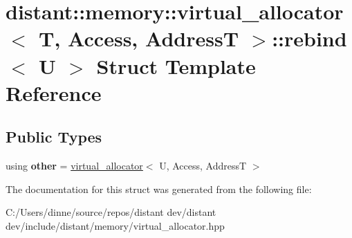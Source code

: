 \hypertarget{structdistant_1_1memory_1_1virtual__allocator_1_1rebind}{}\section{distant\+:\+:memory\+:\+:virtual\+\_\+allocator$<$ T, Access, AddressT $>$\+:\+:rebind$<$ U $>$ Struct Template Reference}
\label{structdistant_1_1memory_1_1virtual__allocator_1_1rebind}
\subsection*{Public Types}
\begin{DoxyCompactItemize}
\item 
\mbox{\label{structdistant_1_1memory_1_1virtual__allocator_1_1rebind_a9ffd236ad77f69d1719ac1d95e93cd1b}} 
using {\bfseries other} = \mbox{\hyperlink{classdistant_1_1memory_1_1virtual__allocator}{virtual\+\_\+allocator}}$<$ U, Access, AddressT $>$
\end{DoxyCompactItemize}


The documentation for this struct was generated from the following file\+:\begin{DoxyCompactItemize}
\item 
C\+:/\+Users/dinne/source/repos/distant dev/distant dev/include/distant/memory/virtual\+\_\+allocator.\+hpp\end{DoxyCompactItemize}
